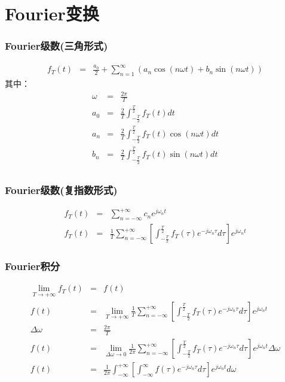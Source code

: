 \documentclass{beamer}
\begin{document}
\section{Fourier变换}
\label{sec-6}
\begin{frame}
\frametitle{Fourier级数(三角形式)}
\label{sec-6-1}

\begin{eqnarray*}
f_T(t) & =& \frac{a_0}{2}+\sum_{n=1}^{\infty}(a_n\cos(n\omega t)+b_n\sin(n\omega t))  
\end{eqnarray*}
其中：
\begin{eqnarray*}
\omega & =& \frac{2\pi}{T}\\
a_0 &=& \frac{2}{T}\int_{-\frac{T}{2}}^{\frac{T}{2}}f_T(t)dt \\
a_n &=& \frac{2}{T}\int_{-\frac{T}{2}}^{\frac{T}{2}}f_T(t)\cos(n\omega t)dt \\
b_n &=& \frac{2}{T}\int_{-\frac{T}{2}}^{\frac{T}{2}}f_T(t)\sin(n\omega t)dt \\
\end{eqnarray*}
\end{frame}
\begin{frame}
\frametitle{Fourier级数(复指数形式)}
\label{sec-6-2}

\begin{eqnarray*}
f_T(t) & = & \sum_{n=-\infty}^{+ \infty}c_n e^{j\omega_n t} \\
f_T(t) & = & \frac{1}{T}\sum_{n=-\infty}^{+\infty}\left[ \int_{- \frac{T}{2} }^{\frac{T}{2}}f_T(\tau)e^{-j\omega_n\tau}d\tau\right] e^{j\omega_n t} 
\end{eqnarray*}
\end{frame}
\begin{frame}
\frametitle{Fourier积分}
\label{sec-6-3}

\begin{eqnarray*}
\lim_{T\rightarrow+\infty}f_T(t) &=& f(t) \\
f(t) & = & \lim_{T\rightarrow+\infty}\frac{1}{T}\sum_{n=-\infty}^{+\infty}\left[ \int_{- \frac{T}{2} }^{\frac{T}{2}}f_T(\tau)e^{-j\omega_n\tau}d\tau\right] e^{j\omega_n t} \\
\Delta\omega &=& \frac{2\pi}{T} \\
f(t) & = & \lim_{\Delta\omega\rightarrow 0}\frac{1}{2\pi}\sum_{n=-\infty}^{+ \infty}\left[ \int_{- \frac{T}{2} }^{\frac{T}{2}}f_T(\tau)e^{-j\omega_n\tau}d\tau\right] e^{j\omega_n t}\Delta\omega \\
f(t) & = & \frac{1}{2\pi}\int_{-\infty}^{+\infty}\left[ \int_{-\infty }^{\infty}f(\tau)e^{-j\omega_n\tau}d\tau\right] e^{j\omega_n t}d\omega
\end{eqnarray*}
\end{frame}
\end{document}

